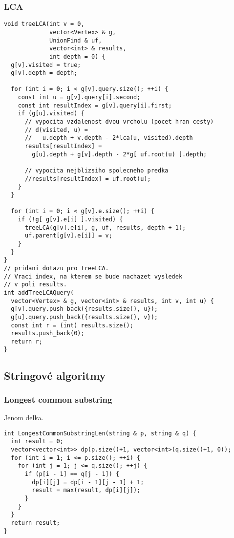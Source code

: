 \documentclass{article}
\begin{document}
\subsubsection{LCA}
\begin{lstlisting}
void treeLCA(int v = 0, 
             vector<Vertex> & g,
             UnionFind & uf,
             vector<int> & results,
             int depth = 0) {
  g[v].visited = true;
  g[v].depth = depth;

  for (int i = 0; i < g[v].query.size(); ++i) {
    const int u = g[v].query[i].second;
    const int resultIndex = g[v].query[i].first;
    if (g[u].visited) {
      // vypocita vzdalenost dvou vrcholu (pocet hran cesty)
      // d(visited, u) = 
      //   u.depth + v.depth - 2*lca(u, visited).depth
      results[resultIndex] = 
        g[u].depth + g[v].depth - 2*g[ uf.root(u) ].depth;

      // vypocita nejblizsiho spolecneho predka
      //results[resultIndex] = uf.root(u);
    }
  }

  for (int i = 0; i < g[v].e.size(); ++i) {
    if (!g[ g[v].e[i] ].visited) {
      treeLCA(g[v].e[i], g, uf, results, depth + 1);
      uf.parent[g[v].e[i]] = v;
    }
  }
}
// pridani dotazu pro treeLCA. 
// Vraci index, na kterem se bude nachazet vysledek
// v poli results.
int addTreeLCAQuery(
  vector<Vertex> & g, vector<int> & results, int v, int u) {
  g[v].query.push_back({results.size(), u});
  g[u].query.push_back({results.size(), v});
  const int r = (int) results.size();
  results.push_back(0);
  return r;
}
\end{lstlisting}

\subsection{Stringové algoritmy}
\subsubsection{Longest common substring}
Jenom delka.
\begin{lstlisting}
int LongestCommonSubstringLen(string & p, string & q) {
  int result = 0;
  vector<vector<int>> dp(p.size()+1, vector<int>(q.size()+1, 0));
  for (int i = 1; i <= p.size(); ++i) {
    for (int j = 1; j <= q.size(); ++j) {
      if (p[i - 1] == q[j - 1]) {
        dp[i][j] = dp[i - 1][j - 1] + 1;
        result = max(result, dp[i][j]);
      }
    }
  }
  return result;
}
\end{lstlisting}
\end{document}
